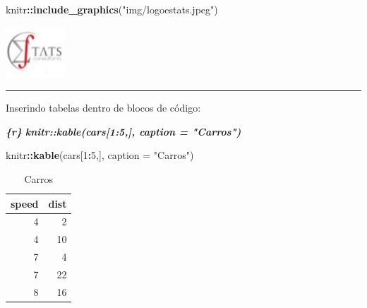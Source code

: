 \documentclass[
]{book}
\newenvironment{Shaded}{\begin{snugshade}}{\end{snugshade}}
\newcommand{\DataTypeTok}[1]{\textcolor[rgb]{0.13,0.29,0.53}{#1}}
\newcommand{\DecValTok}[1]{\textcolor[rgb]{0.00,0.00,0.81}{#1}}
\newcommand{\InformationTok}[1]{\textcolor[rgb]{0.56,0.35,0.01}{\textbf{\textit{#1}}}}
\newcommand{\KeywordTok}[1]{\textcolor[rgb]{0.13,0.29,0.53}{\textbf{#1}}}
\newcommand{\NormalTok}[1]{#1}
\newcommand{\OperatorTok}[1]{\textcolor[rgb]{0.81,0.36,0.00}{\textbf{#1}}}
\newcommand{\StringTok}[1]{\textcolor[rgb]{0.31,0.60,0.02}{#1}}
\begin{document}
\begin{Shaded}
\begin{Highlighting}[]
\NormalTok{knitr}\OperatorTok{::}\KeywordTok{include\_graphics}\NormalTok{(}\StringTok{"img/logoestats.jpeg"}\NormalTok{)}
\end{Highlighting}
\end{Shaded}

\begin{center}\includegraphics[width=0.89in]{img/logoestats} \end{center}

\begin{center}\rule{0.5\linewidth}{0.5pt}\end{center}

Inserindo tabelas dentro de blocos de código:

\begin{Shaded}
\begin{Highlighting}[]
\InformationTok{\textasciigrave{}\textasciigrave{}\textasciigrave{}\{r\}}
\InformationTok{knitr::kable(cars[1:5,], caption = "Carros")}
\InformationTok{\textasciigrave{}\textasciigrave{}\textasciigrave{}}
\end{Highlighting}
\end{Shaded}

\begin{Shaded}
\begin{Highlighting}[]
\NormalTok{knitr}\OperatorTok{::}\KeywordTok{kable}\NormalTok{(cars[}\DecValTok{1}\OperatorTok{:}\DecValTok{5}\NormalTok{,], }\DataTypeTok{caption =} \StringTok{"Carros"}\NormalTok{)}
\end{Highlighting}
\end{Shaded}

\begin{table}

\caption{\label{tab:unnamed-chunk-29}Carros}
\centering
\begin{tabular}[t]{r|r}
\hline
speed & dist\\
\hline
4 & 2\\
\hline
4 & 10\\
\hline
7 & 4\\
\hline
7 & 22\\
\hline
8 & 16\\
\hline
\end{tabular}
\end{table}
\end{document}
